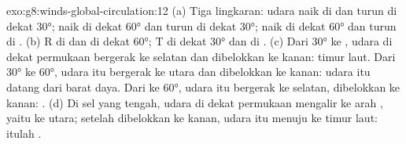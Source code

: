 \begin{solution}{exo:g8:winds-global-circulation:12}
(a) Tiga lingkaran: udara naik di  dan turun di dekat
\ang{30}; naik di dekat \ang{60} dan turun di dekat \ang{30}; naik di dekat
\ang{60} dan turun di . (b) R di  dan di dekat \ang{60};
T di dekat \ang{30} dan di . (c) Dari \ang{30} ke , udara
di dekat permukaan bergerak ke selatan dan dibelokkan ke kanan: 
timur laut. Dari \ang{30} ke \ang{60}, udara itu bergerak ke utara dan
dibelokkan ke kanan: udara itu datang dari barat daya. Dari  ke
\ang{60}, udara itu bergerak ke selatan, dibelokkan ke kanan: . (d) Di sel yang tengah, udara di dekat permukaan mengalir ke arah
, yaitu ke utara; setelah dibelokkan ke kanan, udara itu menuju ke
timur laut: itulah .
\end{solution}

